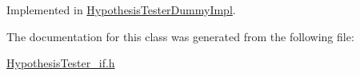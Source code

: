 Implemented in \hyperlink{class_hypothesis_tester_dummy_impl_a0947f4b4e5829dc66bc8cf0a5113b94b}{Hypothesis\+Tester\+Dummy\+Impl}.



The documentation for this class was generated from the following file\+:\begin{DoxyCompactItemize}
\item 
\hyperlink{_hypothesis_tester__if_8h}{Hypothesis\+Tester\+\_\+if.\+h}\end{DoxyCompactItemize}
